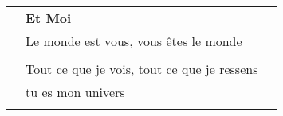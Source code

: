 \documentclass[12pt]{article}
\begin{document}
\begin{center}

\vspace*{1cm}

\begin{figure}
  \raggedleft
  \begin{minipage}{4cm}
  
  \end{minipage}
\end{figure}

\vspace*{2cm}

\vspace*{0.1in}

\begin{spacing}{1.7}
\begin{tabular}{p{4cm} ll}
  & \textbf{\Huge Et Moi} \\ 
  & \Large Le monde est vous, vous êtes le monde \\ 
  & \\
  & \large Tout ce que je vois, tout ce que je ressens  \\ 
  & \large tu es mon univers \\
  & \\
\end{tabular}
\end{spacing}

\end{center}
\end{document}
